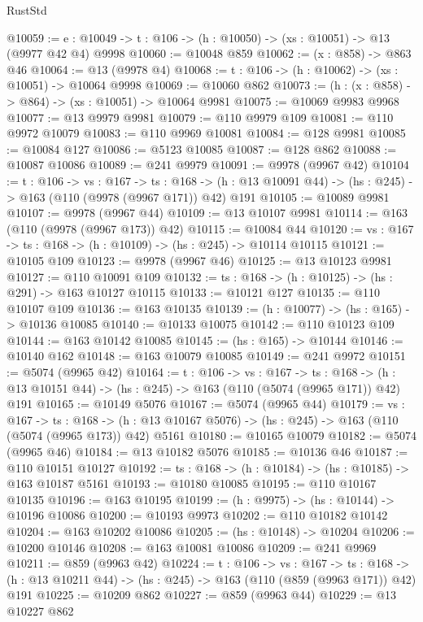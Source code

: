 \begin{lexlean}{RustStd}
\begin{coremodule}
@10059 := {e : @10049} -> {t : @106} -> (h : @10050) -> (xs : @10051) -> @13 (@9977 @42 @4) @9998
@10060 := @10048 @859
@10062 := (x : @858) -> @863 @46
@10064 := @13 (@9978 @4)
@10068 := {t : @106} -> (h : @10062) -> (xs : @10051) -> @10064 @9998
@10069 := @10060 @862
@10073 := (h : (x : @858) -> @864) -> (xs : @10051) -> @10064 @9981
@10075 := @10069 @9983 @9968
@10077 := @13 @9979 @9981
@10079 := @110 @9979 @109
@10081 := @110 @9972 @10079
@10083 := @110 @9969 @10081
@10084 := @128 @9981
@10085 := @10084 @127
@10086 := @5123 @10085
@10087 := @128 @862
@10088 := @10087 @10086
@10089 := @241 @9979
@10091 := @9978 (@9967 @42)
@10104 := {t : @106} ->
  {vs : @167} ->
  {ts : @168} -> (h : @13 @10091 @44) -> (hs : @245) -> @163 (@110 (@9978 (@9967 @171)) @42) @191
@10105 := @10089 @9981
@10107 := @9978 (@9967 @44)
@10109 := @13 @10107 @9981
@10114 := @163 (@110 (@9978 (@9967 @173)) @42)
@10115 := @10084 @44
@10120 := {vs : @167} -> {ts : @168} -> (h : @10109) -> (hs : @245) -> @10114 @10115
@10121 := @10105 @109
@10123 := @9978 (@9967 @46)
@10125 := @13 @10123 @9981
@10127 := @110 @10091 @109
@10132 := {ts : @168} -> (h : @10125) -> (hs : @291) -> @163 @10127 @10115
@10133 := @10121 @127
@10135 := @110 @10107 @109
@10136 := @163 @10135
@10139 := (h : @10077) -> (hs : @165) -> @10136 @10085
@10140 := @10133 @10075
@10142 := @110 @10123 @109
@10144 := @163 @10142 @10085
@10145 := (hs : @165) -> @10144
@10146 := @10140 @162
@10148 := @163 @10079 @10085
@10149 := @241 @9972
@10151 := @5074 (@9965 @42)
@10164 := {t : @106} ->
  {vs : @167} ->
  {ts : @168} -> (h : @13 @10151 @44) -> (hs : @245) -> @163 (@110 (@5074 (@9965 @171)) @42) @191
@10165 := @10149 @5076
@10167 := @5074 (@9965 @44)
@10179 := {vs : @167} ->
  {ts : @168} -> (h : @13 @10167 @5076) -> (hs : @245) -> @163 (@110 (@5074 (@9965 @173)) @42) @5161
@10180 := @10165 @10079
@10182 := @5074 (@9965 @46)
@10184 := @13 @10182 @5076
@10185 := @10136 @46
@10187 := @110 @10151 @10127
@10192 := {ts : @168} -> (h : @10184) -> (hs : @10185) -> @163 @10187 @5161
@10193 := @10180 @10085
@10195 := @110 @10167 @10135
@10196 := @163 @10195
@10199 := (h : @9975) -> (hs : @10144) -> @10196 @10086
@10200 := @10193 @9973
@10202 := @110 @10182 @10142
@10204 := @163 @10202 @10086
@10205 := (hs : @10148) -> @10204
@10206 := @10200 @10146
@10208 := @163 @10081 @10086
@10209 := @241 @9969
@10211 := @859 (@9963 @42)
@10224 := {t : @106} ->
  {vs : @167} ->
  {ts : @168} -> (h : @13 @10211 @44) -> (hs : @245) -> @163 (@110 (@859 (@9963 @171)) @42) @191
@10225 := @10209 @862
@10227 := @859 (@9963 @44)
@10229 := @13 @10227 @862

\end{coremodule}
\end{lexlean}

